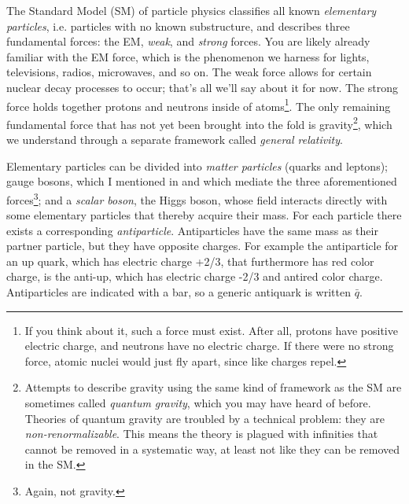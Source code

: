 The Standard Model (SM) of particle physics classifies all 
known
{\it elementary particles}, i.e. particles with no known substructure,
and describes three fundamental forces: the EM,
{\it weak}, and {\it strong} forces. 
You are likely already familiar with the EM force, which is the
phenomenon we harness for lights, televisions, radios, microwaves, and so on.
The weak force allows for certain nuclear decay processes to occur; that's all
we'll say about it for now. The strong force holds together protons and neutrons
inside of atoms\footnote{If you think about it, such a force must exist. After
all, protons have positive electric charge, and neutrons have no electric
charge. If there were no strong force, atomic nuclei would just fly apart, since
like charges repel.}. The only remaining fundamental force that has not yet been
brought into the fold is gravity\footnote{Attempts to describe gravity using the
same kind of framework as the SM are sometimes called {\it quantum gravity},
which you may have heard of before. Theories of quantum gravity are troubled by
a technical problem: they are {\it non-renormalizable}. This means the theory is
plagued with infinities that cannot be removed in a systematic way, at least not
like they can be removed in the SM.}, which we understand through a separate
framework called {\it general relativity}.

Elementary particles can be divided into
{\it matter particles} (quarks and leptons); gauge bosons, which
I mentioned in  and which mediate
the three aforementioned forces\footnote{Again, not gravity.}; 
and a {\it scalar boson}, the Higgs boson,
whose field interacts directly with some elementary particles that thereby
acquire their mass. For each particle there exists a corresponding
{\it antiparticle}. Antiparticles have the same mass as
their partner particle, but they have opposite charges. For example the
antiparticle for an up quark, which has electric charge +2/3, that furthermore
has red color charge, is the anti-up, which has electric charge -2/3 and antired
color charge. Antiparticles are indicated with a bar, so a generic antiquark is
written $\bar{q}$.

